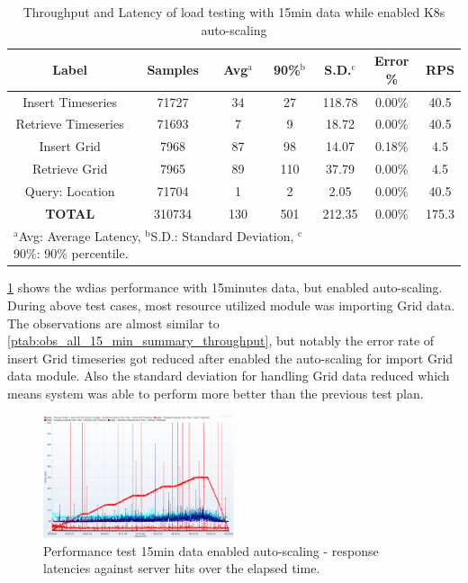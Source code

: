 \documentclass[conference]{IEEEtran}
\begin{document}
\begin{table}[htbp]
\caption{Throughput and Latency of load testing with 15min data while enabled K8s
auto-scaling}
\begin{center}
\begin{adjustbox}{width=0.45\textwidth}
\footnotesize
\begin{tabular}{|c|c|c|c|c|c|c|}
\hline
\textbf{Label} & \textbf{Samples} & \textbf{Avg$^{\mathrm{a}}$} & \textbf{90\%$^{\mathrm{b}}$} & \textbf{S.D.$^{\mathrm{c}}$} & \textbf{Error \%} & \textbf{RPS} \\ \hline
Insert Timeseries & 71727 & 34 & 27 & 118.78 & 0.00\% & 40.5 \\ \hline
Retrieve Timeseries & 71693 & 7 & 9 & 18.72 & 0.00\% & 40.5 \\ \hline
Insert Grid & 7968 & 87 & 98 & 14.07 & 0.18\% & 4.5 \\ \hline
Retrieve Grid & 7965 & 89 & 110 & 37.79 & 0.00\% & 4.5 \\ \hline
Query: Location & 71704 & 1 & 2 & 2.05 & 0.00\% & 40.5 \\ \hline
\textbf{TOTAL} & 310734 & 130 & 501 & 212.35 & 0.00\% & 175.3 \\ \hline
\multicolumn{4}{l}{$^{\mathrm{a}}$Avg: Average Latency, $^{\mathrm{b}}$S.D.: Standard Deviation, $^{\mathrm{c}}$90\%: 90\% percentile.}
\end{tabular}
\end{adjustbox}
\label{ptab:obs_all_auto_15_min_summary_throughput}
\end{center}
\end{table}

\cref{ptab:obs_all_auto_15_min_summary_throughput} shows the \acrshort{wdias} performance with 15minutes data, but enabled auto-scaling. During above test cases, most resource utilized module was importing Grid data.
The observations are almost similar to \cref{ptab:obs_all_15_min_summary_throughput}, but notably the error rate of insert Grid timeseries got reduced after enabled the auto-scaling for import Grid data module. Also the standard deviation for handling Grid data reduced which means system was able to perform more better than the previous test plan.

\begin{figure}[htbp]
\centerline{\includegraphics[width=0.5\textwidth]{results/obs/all_auto/obs_all_auto_15m_res_latencies_against_hits.png}}
\caption{Performance test 15min data enabled auto-scaling - response latencies against server hits over the elapsed time.}
\label{pfi:test_obs_auto_all_15_min_latency_vs_hits}
\end{figure}
\end{document}
